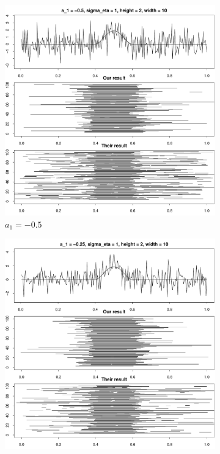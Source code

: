 \documentclass[a4paper,12pt]{article}
\begin{document}
\begin{figure}
\begin{subfigure}{.5\textwidth}
  \centering
  \includegraphics[width=.9\linewidth]{Plots/min_int_with_T_250_a1_-05_height_2_width_10.pdf}
  \caption{$a_1 = -0.5$}
  \label{fig:sfig1}
\end{subfigure}%
\begin{subfigure}{.5\textwidth}
  \centering
  \includegraphics[width=.9\linewidth]{Plots/min_int_with_T_250_a1_-025_height_2_width_10.pdf}

\end{subfigure}
\end{figure}
\end{document}
